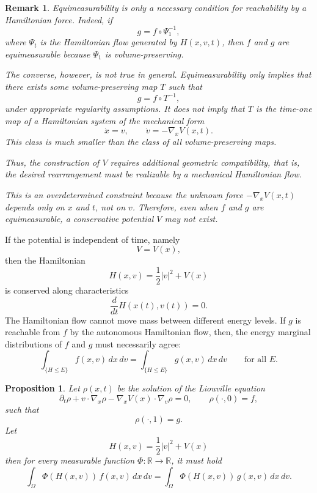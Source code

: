 \documentclass[11pt]{article}
\newtheorem{proposition}{Proposition}[section]
\newtheorem{remark}{Remark}[section]
\newcommand{\R}{{\mathbb R}}
\begin{document}
\begin{remark}
Equimeasurability is only a necessary condition for reachability by a Hamiltonian force. 
Indeed, if
\[
g=f\circ\Psi_1^{-1},
\]
where \(\Psi_t\) is the Hamiltonian flow generated by $H(x,v,t)$, 
then \(f\) and \(g\) are equimeasurable because \(\Psi_1\) is
volume-preserving.

The converse, however, is not true in general. Equimeasurability only implies
that there exists some volume-preserving map \(T\) such that
\[
g=f\circ T^{-1},
\]
under appropriate regularity assumptions. It does not imply that \(T\) is the
time-one map of a Hamiltonian system of the mechanical form
\[
\dot x=v,\qquad \dot v=-\nabla_x V(x,t).
\]
This class is much smaller than the class of all volume-preserving maps.

Thus, the construction of \(V\) requires additional geometric compatibility, that is, 
the desired rearrangement must be realizable by a mechanical Hamiltonian flow.

This is an overdetermined constraint because the unknown force
\(-\nabla_x V(x,t)\) depends only on \(x\) and \(t\), not on \(v\).
Therefore, even when \(f\) and \(g\) are equimeasurable, a conservative
potential \(V\) may not exist.
\end{remark}

If the potential is independent of time, namely
\[
        V=V(x),
\]
then the Hamiltonian
\[
        H(x,v)=\frac12 |v|^2+V(x)
\]
is conserved along characteristics
\[
        \frac{d}{dt}H(x(t),v(t))=0.
\]
The Hamiltonian flow cannot move mass between different energy
levels. If \(g\) is reachable from \(f\) by the autonomous Hamiltonian flow,
then,  the energy marginal distributions of \(f\) and \(g\) must necessarily agree:
\[
        \int_{\{H\le E\}} f(x,v)\,dx\,dv
        =
        \int_{\{H\le E\}} g(x,v)\,dx\,dv
        \qquad \text{for all }E .
\]

\begin{proposition}\label{prop:autonomous}
Let $\rho(x,t)$ be the solution 
of the Liouville equation
\[
\partial_t\rho + v\cdot\nabla_x\rho - \nabla_x V(x)\cdot\nabla_v\rho = 0,
\qquad
\rho(\cdot,0)=f,
\]
such that 
\[
\rho(\cdot,1)=g.
\]
Let \[
        H(x,v)=\frac12 |v|^2+V(x)
\]
then for every measurable function \(\Phi : \R \to \R\), it must hold
\[
        \int_{\Omega} \Phi(H(x,v))\, f(x,v)\,dx\,dv
        =
        \int_{\Omega} \Phi(H(x,v))\, g(x,v)\,dx\,dv .
\]

\end{proposition}
\end{document}
